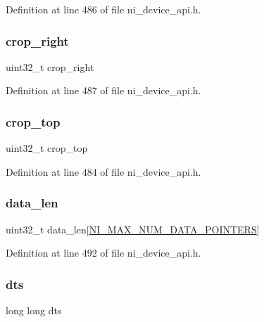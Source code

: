 Definition at line 486 of file ni\+\_\+device\+\_\+api.\+h.

\mbox{\label{struct__ni__frame_a8cc639a91d2316c8edcc80c43d8f2997}} 
\subsubsection{\texorpdfstring{crop\_right}{crop\_right}}
{\footnotesize\ttfamily uint32\+\_\+t crop\+\_\+right}



Definition at line 487 of file ni\+\_\+device\+\_\+api.\+h.

\mbox{\label{struct__ni__frame_a2558646f2dacf6b78c7e2af61c1c3a66}} 
\subsubsection{\texorpdfstring{crop\_top}{crop\_top}}
{\footnotesize\ttfamily uint32\+\_\+t crop\+\_\+top}



Definition at line 484 of file ni\+\_\+device\+\_\+api.\+h.

\mbox{\label{struct__ni__frame_a1a8409b0329d97e559c776a923788f18}} 
\subsubsection{\texorpdfstring{data\_len}{data\_len}}
{\footnotesize\ttfamily uint32\+\_\+t data\+\_\+len\mbox{[}\mbox{\hyperlink{ni__device__api_8h_a31f22c2de7d8a94f2e33552cf704545a}{N\+I\+\_\+\+M\+A\+X\+\_\+\+N\+U\+M\+\_\+\+D\+A\+T\+A\+\_\+\+P\+O\+I\+N\+T\+E\+RS}}\mbox{]}}



Definition at line 492 of file ni\+\_\+device\+\_\+api.\+h.

\mbox{\label{struct__ni__frame_a5b339e32ee63aeb67076062ba959ca51}} 
\subsubsection{\texorpdfstring{dts}{dts}}
{\footnotesize\ttfamily long long dts}



